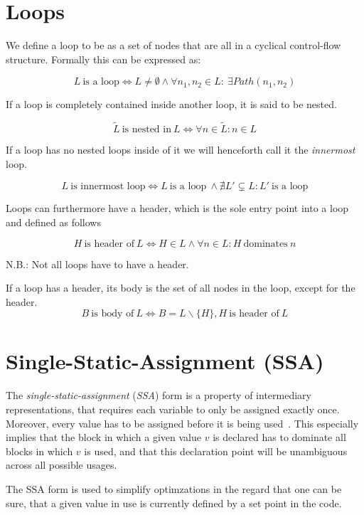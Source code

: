 
\section{Loops}\label{sec:basics:loops}

We define a loop to be as a set of nodes that are all in a cyclical control-flow structure.
Formally this can be expressed as:

$$L~\text{is a loop} \Longleftrightarrow L \neq \emptyset \wedge \forall n_1, n_2 \in L:~\exists Path(n_1, n_2)$$

If a loop is completely contained inside another loop, it is said to be nested.

$$\tilde{L}~\text{is nested in}~L \Longleftrightarrow \forall n \in \tilde{L}: n \in L$$

If a loop has no nested loops inside of it we will henceforth call it the \textit{innermost} loop.

$$L~\text{is innermost loop} \Longleftrightarrow L~\text{is a loop}~\wedge \nexists L' \subsetneq L: L'~\text{is a loop}$$

Loops can furthermore have a header, which is the sole entry point into a loop~\cite{aebi18bachelorarbeit} and defined as follows

$$H~\text{is header of}~L \Longleftrightarrow H \in L \wedge \forall n \in L: H~\text{dominates}~n$$

N.B.: Not all loops have to have a header.

If a loop has a header, its body is the set of all nodes in the loop, except for the header.
$$B~\text{is body of}~L \Longleftrightarrow B = L \backslash \{H\}, H~\text{is header of}~L$$

\section{Single-Static-Assignment (SSA)}\label{sec:basics:ssa}

The \textit{single-static-assignment} (\textit{SSA}) form is a property of intermediary representations, that requires each variable to only be assigned exactly once.
Moreover, every value has to be assigned before it is being used~\cite{cytron91}.
This especially implies that the block in which a given value $v$ is declared has to dominate all blocks in which $v$ is used, and that this declaration point will be unambiguous across all possible usages.

The SSA form is used to simplify optimzations in the regard that one can be sure, that a given value in use is currently defined by a set point in the code.

